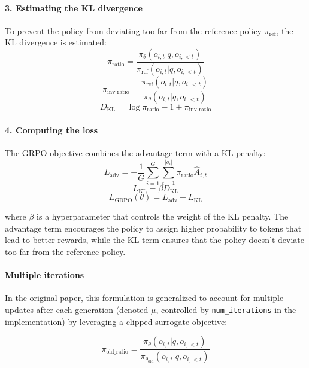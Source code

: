 \paragraph{3. Estimating the KL divergence} To prevent the policy from deviating too far from the reference policy $\pi_{\text{ref}}$, the KL divergence is estimated:
\begin{equation}
\pi_\text{ratio} = \frac{\pi_\theta(o_{i,t} | q, o_{i,<t})}{\pi_{\text{ref}}(o_{i,t} | q, o_{i,<t})}
\end{equation}
\begin{equation}
\pi_\text{inv\_ratio} = \frac{\pi_{\text{ref}}(o_{i,t} | q, o_{i,<t})}{\pi_\theta(o_{i,t} | q, o_{i,<t})}
\end{equation}
\begin{equation}
D_{\text{KL}} = \log\pi_\text{ratio} - 1 + \pi_\text{inv\_ratio}
\end{equation}

\paragraph{4. Computing the loss} The GRPO objective combines the advantage term with a KL penalty:
\begin{equation}
L_{\text{adv}} = -\frac{1}{G}\sum_{i=1}^{G}\sum_{t=1}^{|o_i|}\pi_\text{ratio}\hat{A}_{i,t}
\end{equation}
\begin{equation}
L_{\text{KL}} = \beta D_{\text{KL}}
\end{equation}
\begin{equation}
L_{\text{GRPO}}(\theta) = L_{\text{adv}} - L_{\text{KL}}
\end{equation}

where $\beta$ is a hyperparameter that controls the weight of the KL penalty. The advantage term encourages the policy to assign higher probability to tokens that lead to better rewards, while the KL term ensures that the policy doesn't deviate too far from the reference policy.

\paragraph{Multiple iterations} In the original paper, this formulation is generalized to account for multiple updates after each generation (denoted $\mu$, controlled by \texttt{num\_iterations} in the implementation) by leveraging a clipped surrogate objective:

\begin{equation}
\pi_\text{old\_ratio} = \frac{\pi_\theta(o_{i,t} | q, o_{i,<t})}{\pi_{\theta_{\text{old}}}(o_{i,t} | q, o_{i,<t})}
\end{equation}

